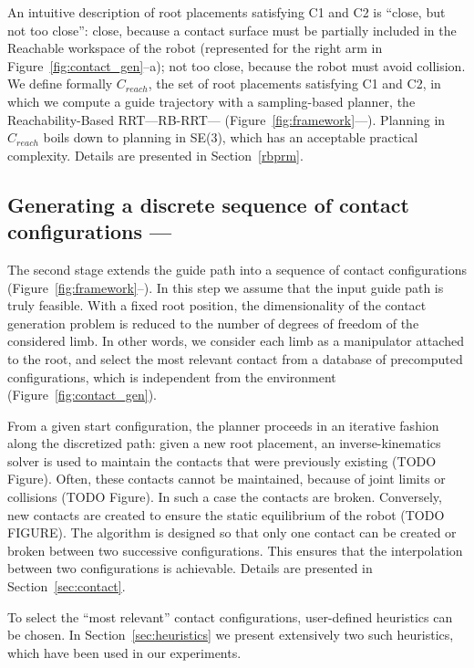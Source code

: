 An intuitive description of root placements satisfying C1 and C2 is ``close, but not too close'': close, because a contact surface must be partially included in the Reachable workspace of the robot (represented for the right arm in Figure~\ref{fig:contact_gen}--a); not too close, because the robot must avoid collision. We define formally $C_{reach}$, the set of root placements satisfying C1 and C2, in which we compute a guide trajectory with a sampling-based planner, the Reachability-Based RRT---RB-RRT--- (Figure~\ref{fig:framework}---\Pa). Planning in $C_{reach}$ boils down to planning in SE(3), which has an acceptable practical complexity.
%
Details are presented in Section~\ref{rbprm}.

\subsection{Generating a discrete sequence of contact configurations --- \Pb}

The second stage extends the guide path into a sequence of contact configurations (Figure~\ref{fig:framework}--\Pb). In this
step we assume that the input guide path is truly feasible.
With a fixed root position, the dimensionality of the 
contact generation problem is reduced to the number of degrees of freedom of the considered limb. In other words, we consider each limb as a manipulator attached to the root, and select the most relevant contact from a database of precomputed configurations, which is independent from the environment (Figure~\ref{fig:contact_gen}).

From a given start configuration, the planner proceeds in an iterative fashion along the discretized path: given a new root placement, an inverse-kinematics solver 
is used to maintain the contacts that were previously existing (TODO Figure). Often, these contacts cannot be maintained, because of joint limits or collisions (TODO Figure).
In such a case the contacts are broken. Conversely, new contacts are created to ensure the static equilibrium of the robot (TODO FIGURE).
The algorithm is designed so that only one contact can be created or broken between two successive configurations. This ensures that the interpolation between two configurations is achievable.
Details are presented in Section~\ref{sec:contact}. 

To select the ``most relevant'' contact configurations, user-defined heuristics can be chosen. In Section~\ref{sec:heuristics} we present extensively two such heuristics, which have been used in our experiments.


